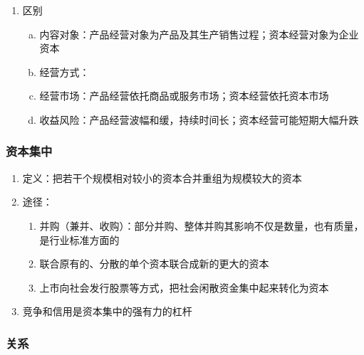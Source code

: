 \documentclass[12pt]{book}
\begin{document}
\begin{enumerate}[1.]
\begin{enumerate}[(1)]
\begin{enumerate}[a.]
                    \end{enumerate}
              \item 区别
                    \begin{enumerate}[a.]
                        \item 内容对象：产品经营对象为产品及其生产销售过程；资本经营对象为企业资本
                        \item 经营方式：
                        \item 经营市场：产品经营依托商品或服务市场；资本经营依托资本市场
                        \item 收益风险：产品经营波幅和缓，持续时间长；资本经营可能短期大幅升跌
                    \end{enumerate}
          \end{enumerate}
\end{enumerate}






\subsubsection{资本集中}

\begin{enumerate}[1.]
    \item 定义：把若干个规模相对较小的资本合并重组为规模较大的资本
    \item 途径：
          \begin{enumerate}[(1)]
              \item 并购（兼并、收购）：部分并购、整体并购其影响不仅是数量，也有质量，是行业标准方面的
              \item 联合原有的、分散的单个资本联合成新的更大的资本
              \item 上市向社会发行股票等方式，把社会闲散资金集中起来转化为资本
          \end{enumerate}
    \item 竞争和信用是资本集中的强有力的杠杆
\end{enumerate}




\subsubsection{关系}
\end{document}
